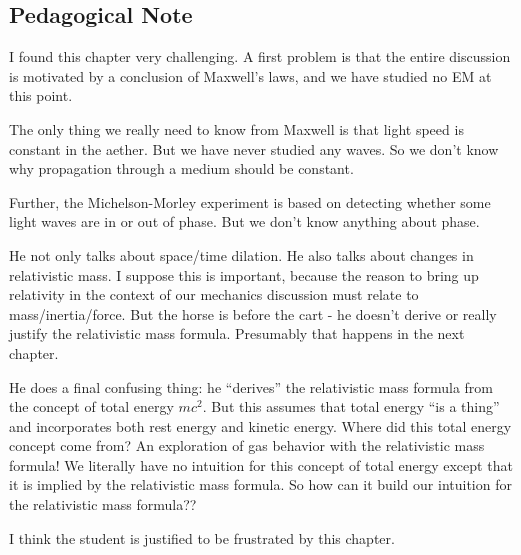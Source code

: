 \subsection{Pedagogical Note}

I found this chapter very challenging. A first problem is that the
entire discussion is motivated by a conclusion of Maxwell's laws, and we
have studied no EM at this point.

The only thing we really need to know from Maxwell is that light speed
is constant in the aether. But we have never studied any waves. So we
don't know why propagation through a medium should be constant.

Further, the Michelson-Morley experiment is based on detecting whether
some light waves are in or out of phase. But we don't know anything
about phase.

He not only talks about space/time dilation. He also talks about changes
in relativistic mass. I suppose this is important, because the reason to
bring up relativity in the context of our mechanics discussion must
relate to mass/inertia/force. But the horse is before the cart - he
doesn't derive or really justify the relativistic mass formula.
Presumably that happens in the next chapter.

He does a final confusing thing: he ``derives'' the relativistic mass
formula from the concept of total energy $mc^2$. But this assumes that
total energy ``is a thing'' and incorporates both rest energy and
kinetic energy. Where did this total energy concept come from? An
exploration of gas behavior with the relativistic mass formula! We
literally have no intuition for this concept of total energy except that
it is implied by the relativistic mass formula. So how can it build our
intuition for the relativistic mass formula??

I think the student is justified to be frustrated by this chapter.
